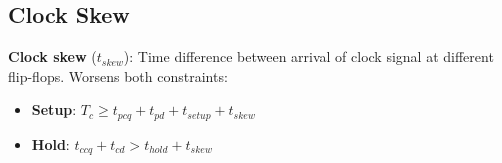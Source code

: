 \subsection{Clock Skew}

\begin{definition}
\textbf{Clock skew} ($t_{skew}$): Time difference between arrival of clock signal at different flip-flops. Worsens both constraints:
\begin{itemize}
    \item \textbf{Setup}: $T_c \geq t_{pcq} + t_{pd} + t_{setup} + t_{skew}$
    \item \textbf{Hold}: $t_{ccq} + t_{cd} > t_{hold} + t_{skew}$
\end{itemize}
\end{definition}
